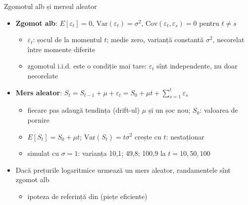 \begin{frame}{Zgomotul alb și mersul aleator}
\itemsize{\footnotesize}
\begin{itemize}
    \item \textbf{Zgomot alb}: $E[\varepsilon_t] = 0$, $\text{Var}(\varepsilon_t) = \sigma^2$, $\text{Cov}(\varepsilon_t, \varepsilon_s) = 0$ pentru $t \ne s$
    \begin{itemize}
        \item $\varepsilon_t$: șocul de la momentul $t$; medie zero, varianță constantă $\sigma^2$, necorelat între momente diferite
        \item zgomotul i.i.d. este o condiție mai tare: $\varepsilon_t$ sînt independente, nu doar necorelate
    \end{itemize}
    \item \textbf{Mers aleator}: $S_t = S_{t-1} + \mu + \varepsilon_t = S_0 + \mu t + \sum_{s=1}^t \varepsilon_s$
    \begin{itemize}
        \item fiecare pas adaugă tendința (drift-ul) $\mu$ și un șoc nou; $S_0$: valoarea de pornire
        \item $E[S_t] = S_0 + \mu t$; $\text{Var}(S_t) = t\sigma^2$ crește cu $t$: nestaționar
        \item simulat cu $\sigma = 1$: varianța 10{,}1; 49{,}8; 100{,}9 la $t = 10, 50, 100$
    \end{itemize}
    \item Dacă prețurile logaritmice urmează un mers aleator, randamentele sînt zgomot alb
    \begin{itemize}
        \item ipoteza de referință din  (piețe eficiente)
    \end{itemize}
\end{itemize}
\end{frame}

